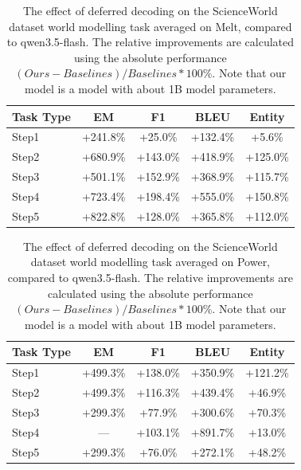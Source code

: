 \begin{table}[h]
\centering
    \setlength\tabcolsep{15pt}
    \setlength\extrarowheight{0pt}
\caption{The effect of deferred decoding on the ScienceWorld dataset \citep{wang-etal-2022-scienceworld} world modelling task averaged on Melt, compared to qwen3.5-flash. The relative improvements are calculated using the absolute performance $(Ours - Baselines) / Baselines * 100\%$. Note that our model is a model with about 1B model parameters.}
\label{tab:scienceworld21}
\begin{tabular}{lcccc}
\toprule
\textbf{Task Type} & \textbf{EM} & \textbf{F1}
  & \textbf{BLEU} & \textbf{Entity}\\
\midrule
Step1 & +241.8\% & +25.0\% & +132.4\% & +5.6\% \\
Step2 & +680.9\% & +143.0\% & +418.9\% & +125.0\% \\
Step3 & +501.1\% & +152.9\% & +368.9\% & +115.7\% \\
Step4 & +723.4\% & +198.4\% & +555.0\% & +150.8\% \\
Step5 & +822.8\% & +128.0\% & +365.8\% & +112.0\% \\

\bottomrule
\end{tabular}
\end{table}


\begin{table}[h]
\centering
    \setlength\tabcolsep{15pt}
    \setlength\extrarowheight{0pt}
\caption{The effect of deferred decoding on the ScienceWorld dataset \citep{wang-etal-2022-scienceworld} world modelling task averaged on Power, compared to qwen3.5-flash. The relative improvements are calculated using the absolute performance $(Ours - Baselines) / Baselines * 100\%$. Note that our model is a model with about 1B model parameters.}
\label{tab:scienceworld22}
\begin{tabular}{lcccc}
\toprule
\textbf{Task Type} & \textbf{EM} & \textbf{F1}
  & \textbf{BLEU} & \textbf{Entity}\\
\midrule
Step1 & +499.3\% & +138.0\% & +350.9\% & +121.2\% \\
Step2 & +499.3\% & +116.3\% & +439.4\% & +46.9\% \\
Step3 & +299.3\% & +77.9\% & +300.6\% & +70.3\% \\
Step4 & — & +103.1\% & +891.7\% & +13.0\% \\
Step5 & +299.3\% & +76.0\% & +272.1\% & +48.2\% \\

\bottomrule
\end{tabular}
\end{table}


